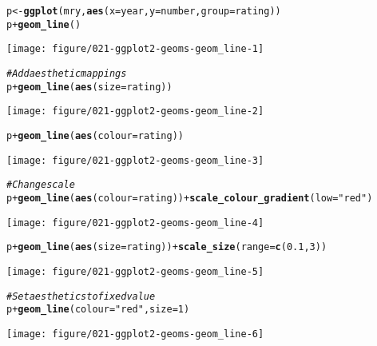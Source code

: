 \documentclass[a4paper,titlepage]{tufte-handout}\usepackage[]{graphicx}\usepackage[]{color}
\makeatletter
\def\maxwidth{ %
  \ifdim\Gin@nat@width>\linewidth
    \linewidth
  \else
    \Gin@nat@width
  \fi
}
\newcommand{\hlnum}[1]{\textcolor[rgb]{0.686,0.059,0.569}{#1}}%
\newcommand{\hlstr}[1]{\textcolor[rgb]{0.192,0.494,0.8}{#1}}%
\newcommand{\hlcom}[1]{\textcolor[rgb]{0.678,0.584,0.686}{\textit{#1}}}%
\newcommand{\hlopt}[1]{\textcolor[rgb]{0,0,0}{#1}}%
\newcommand{\hlstd}[1]{\textcolor[rgb]{0.345,0.345,0.345}{#1}}%
\newcommand{\hlkwb}[1]{\textcolor[rgb]{0.69,0.353,0.396}{#1}}%
\newcommand{\hlkwc}[1]{\textcolor[rgb]{0.333,0.667,0.333}{#1}}%
\newcommand{\hlkwd}[1]{\textcolor[rgb]{0.737,0.353,0.396}{\textbf{#1}}}%
\newenvironment{kframe}{%
 \def\at@end@of@kframe{}%
 \ifinner\ifhmode%
  \def\at@end@of@kframe{\end{minipage}}%
  \begin{minipage}{\columnwidth}%
 \fi\fi%
 \def\FrameCommand##1{\hskip\@totalleftmargin \hskip-\fboxsep
 \colorbox{shadecolor}{##1}\hskip-\fboxsep
     \hskip-\linewidth \hskip-\@totalleftmargin \hskip\columnwidth}%
 \MakeFramed {\advance\hsize-\width
   \@totalleftmargin\z@ \linewidth\hsize
   \@setminipage}}%
 {\par\unskip\endMakeFramed%
 \at@end@of@kframe}
\newenvironment{knitrout}{}{} %
\makeatother
\begin{document}
\begin{knitrout}
\begin{kframe}
\begin{alltt}
\hlstd{p} \hlkwb{<-} \hlkwd{ggplot}\hlstd{(mry,} \hlkwd{aes}\hlstd{(}\hlkwc{x}\hlstd{=year,} \hlkwc{y}\hlstd{=number,} \hlkwc{group}\hlstd{=rating))}
\hlstd{p} \hlopt{+} \hlkwd{geom_line}\hlstd{()}
\end{alltt}
\end{kframe}
\texttt{[image: figure/021-ggplot2-geoms-geom\_line-1]} 
\begin{kframe}\begin{alltt}
\hlcom{# Add aesthetic mappings}
\hlstd{p} \hlopt{+} \hlkwd{geom_line}\hlstd{(}\hlkwd{aes}\hlstd{(}\hlkwc{size} \hlstd{= rating))}
\end{alltt}
\end{kframe}
\texttt{[image: figure/021-ggplot2-geoms-geom\_line-2]} 
\begin{kframe}\begin{alltt}
\hlstd{p} \hlopt{+} \hlkwd{geom_line}\hlstd{(}\hlkwd{aes}\hlstd{(}\hlkwc{colour} \hlstd{= rating))}
\end{alltt}
\end{kframe}
\texttt{[image: figure/021-ggplot2-geoms-geom\_line-3]} 
\begin{kframe}\begin{alltt}
\hlcom{# Change scale}
\hlstd{p} \hlopt{+} \hlkwd{geom_line}\hlstd{(}\hlkwd{aes}\hlstd{(}\hlkwc{colour} \hlstd{= rating))} \hlopt{+} \hlkwd{scale_colour_gradient}\hlstd{(}\hlkwc{low}\hlstd{=}\hlstr{"red"}\hlstd{)}
\end{alltt}
\end{kframe}
\texttt{[image: figure/021-ggplot2-geoms-geom\_line-4]} 
\begin{kframe}\begin{alltt}
\hlstd{p} \hlopt{+} \hlkwd{geom_line}\hlstd{(}\hlkwd{aes}\hlstd{(}\hlkwc{size} \hlstd{= rating))} \hlopt{+} \hlkwd{scale_size}\hlstd{(}\hlkwc{range} \hlstd{=} \hlkwd{c}\hlstd{(}\hlnum{0.1}\hlstd{,} \hlnum{3}\hlstd{))}
\end{alltt}
\end{kframe}
\texttt{[image: figure/021-ggplot2-geoms-geom\_line-5]} 
\begin{kframe}\begin{alltt}
\hlcom{# Set aesthetics to fixed value}
\hlstd{p} \hlopt{+} \hlkwd{geom_line}\hlstd{(}\hlkwc{colour} \hlstd{=} \hlstr{"red"}\hlstd{,} \hlkwc{size} \hlstd{=} \hlnum{1}\hlstd{)}
\end{alltt}
\end{kframe}
\texttt{[image: figure/021-ggplot2-geoms-geom\_line-6]} 

\end{knitrout}
\end{document}
